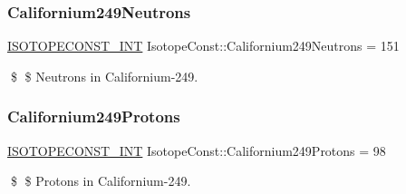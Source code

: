 \subsubsection{\texorpdfstring{Californium249\+Neutrons}{Californium249Neutrons}}
{\footnotesize\ttfamily \mbox{\hyperlink{group___isotope_const-_macros_ga5f18360b3e99483a35c32d789e62621c}{I\+S\+O\+T\+O\+P\+E\+C\+O\+N\+S\+T\+\_\+\+I\+NT}} Isotope\+Const\+::\+Californium249\+Neutrons = 151}

\$ \$ Neutrons in Californium-\/249. \mbox{\label{group___isotope_const-_californium-_cf249_gaa8710be12f8be6077c0de2d03386c42b}} 
\subsubsection{\texorpdfstring{Californium249\+Protons}{Californium249Protons}}
{\footnotesize\ttfamily \mbox{\hyperlink{group___isotope_const-_macros_ga5f18360b3e99483a35c32d789e62621c}{I\+S\+O\+T\+O\+P\+E\+C\+O\+N\+S\+T\+\_\+\+I\+NT}} Isotope\+Const\+::\+Californium249\+Protons = 98}

\$ \$ Protons in Californium-\/249. 